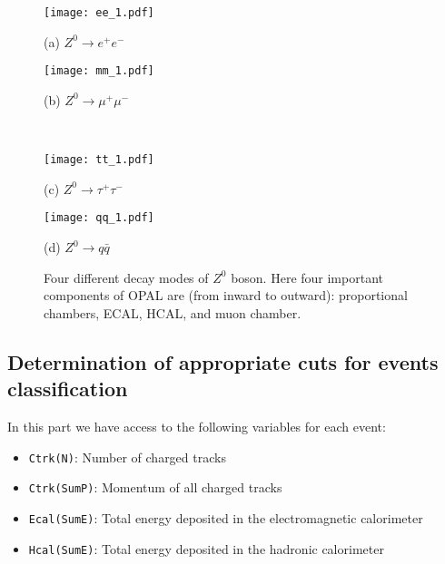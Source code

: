 \begin{figure}[H]   
	\begin{minipage}[t]{0.5\textwidth}
		\texttt{[image: ee\_1.pdf]}
		\begin{center}
			{(a) $  {Z}^0\rightarrow e^+e^- $}
		\end{center}
	\end{minipage} \quad
	\begin{minipage}[t]{0.5\textwidth}
		\texttt{[image: mm\_1.pdf]}
		\begin{center}
			{(b) $ {Z}^0\rightarrow \mu^+\mu^- $}
		\end{center}
	\end{minipage}\\
	
	\begin{minipage}[t]{0.5\textwidth}
		\texttt{[image: tt\_1.pdf]}
		\begin{center}
			{(c) $ {Z}^0\rightarrow \tau^+\tau^- $}
		\end{center}
	\end{minipage} \quad
\begin{minipage}[t]{0.5\textwidth}
		\texttt{[image: qq\_1.pdf]}
		\begin{center}
			{(d) $ {Z}^0\rightarrow q \bar{q}$}
		\end{center}
	\end{minipage}
	\caption{Four different decay modes of $ Z^0 $ boson. Here four important components of OPAL are (from inward to outward): proportional chambers, ECAL, HCAL, and muon chamber.}
\label{fig:eventsDisplay}	
\end{figure}

\subsection{Determination of appropriate cuts for events classification}
In this part we have access to the following variables for each event:
\begin{itemize}
	\item \verb|Ctrk(N)|: Number of charged tracks
	\item \verb|Ctrk(SumP)|: Momentum of all charged tracks
	\item \verb|Ecal(SumE)|: Total energy deposited in the electromagnetic calorimeter
	\item \verb|Hcal(SumE)|: Total energy deposited in the hadronic calorimeter
\end{itemize}


